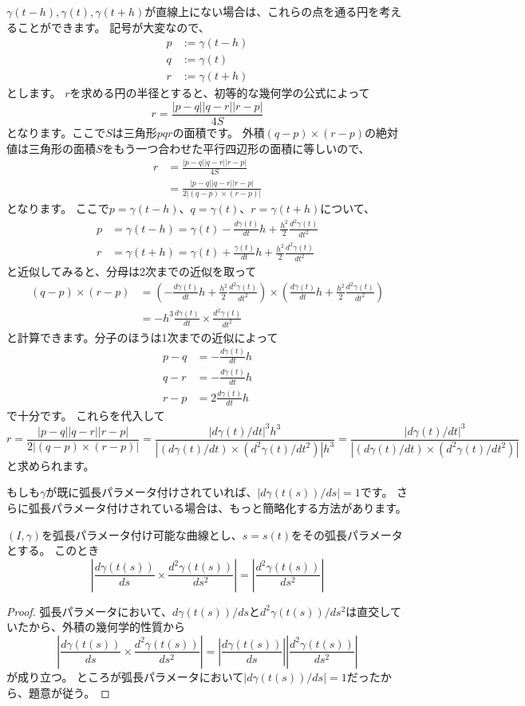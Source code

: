 $\gamma(t-h), \gamma(t), \gamma(t+h)$が直線上にない場合は、これらの点を通る円を考えることができます。
記号が大変なので、
\begin{align*}
  p&:=\gamma(t-h)\\
  q&:=\gamma(t)\\
  r&:=\gamma(t+h)
\end{align*}
とします。
$r$を求める円の半径とすると、初等的な幾何学の公式によって
\[
  r=\frac{|p-q||q-r||r-p|}{4S}
\]
となります。ここで$S$は三角形$pqr$の面積です。
外積$(q-p)\times(r-p)$の絶対値は三角形の面積$S$をもう一つ合わせた平行四辺形の面積に等しいので、
\begin{align*}
  r&=\frac{|p-q||q-r||r-p|}{4S}\\
  &=\frac{|p-q||q-r||r-p|}{2|(q-p)\times(r-p)|}
\end{align*}
となります。
ここで$p=\gamma(t-h)$、$q=\gamma(t)$、$r=\gamma(t+h)$について、
\begin{align*}
  p&=\gamma(t-h)=\gamma(t)-\frac{d\gamma(t)}{dt}h+\frac{h^2}{2}\frac{d^2\gamma(t)}{dt^2}\\
  r&=\gamma(t+h)=\gamma(t)+\frac{\gamma(t)}{dt}h+\frac{h^2}{2}\frac{d^2\gamma(t)}{dt^2}
\end{align*}
と近似してみると、分母は2次までの近似を取って
\begin{align*}
  (q-p)\times(r-p)&=\left(-\frac{d\gamma(t)}{dt}h+\frac{h^2}{2}\frac{d^2\gamma(t)}{dt^2}\right)\times\left(\frac{d\gamma(t)}{dt}h+\frac{h^2}{2}\frac{d^2\gamma(t)}{dt^2}\right)\\
  &=-h^3\frac{d\gamma(t)}{dt}\times\frac{d^2\gamma(t)}{dt^2}
\end{align*}
と計算できます。分子のほうは1次までの近似によって
\begin{align*}
  p-q&=-\frac{d\gamma(t)}{dt}h\\
  q-r&=-\frac{d\gamma(t)}{dt}h\\
  r-p&=2\frac{d\gamma(t)}{dt}h
\end{align*}
で十分です。
これらを代入して
\[
  r=\frac{|p-q||q-r||r-p|}{2|(q-p)\times(r-p)|}=\frac{|d\gamma(t)/dt|^3h^3}{|(d\gamma(t)/dt)\times(d^2\gamma(t)/dt^2)|h^3}=\frac{|d\gamma(t)/dt|^3}{|(d\gamma(t)/dt)\times(d^2\gamma(t)/dt^2)|}
\]
と求められます。

もしも$\gamma$が既に弧長パラメータ付けされていれば、$|d\gamma(t(s))/ds|=1$です。
さらに弧長パラメータ付けされている場合は、もっと簡略化する方法があります。
\begin{lemma}
  $(I,\gamma)$を弧長パラメータ付け可能な曲線とし、$s=s(t)$をその弧長パラメータとする。
  このとき
  \[
    \left|\frac{d\gamma(t(s))}{ds}\times\frac{d^2\gamma(t(s))}{ds^2}\right|=\left|\frac{d^2\gamma(t(s))}{ds^2}\right|
  \]
\end{lemma}
\begin{proof}
  弧長パラメータにおいて、$d\gamma(t(s))/ds$と$d^2\gamma(t(s))/ds^2$は直交していたから、外積の幾何学的性質から
  \[
    \left|\frac{d\gamma(t(s))}{ds}\times\frac{d^2\gamma(t(s))}{ds^2}\right|=\left|\frac{d\gamma(t(s))}{ds}\right|\left|\frac{d^2\gamma(t(s))}{ds^2}\right|
  \]
  が成り立つ。
  ところが弧長パラメータにおいて$|d\gamma(t(s))/ds|=1$だったから、題意が従う。
\end{proof}


